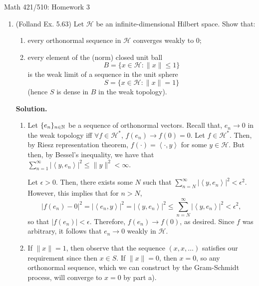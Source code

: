 \documentclass[11pt]{article}
\begin{document}
\begin{center}
{\Large Math 421/510: Homework 3}
\end{center}

\begin{enumerate}[label=\arabic*.]

\item (Folland Ex. 5.63) Let $\mathcal{H}$ be an infinite-dimensional Hilbert space. Show that:
\begin{enumerate}[label=(\alph*)]
\item every orthonormal sequence in $\mathcal{H}$ converges weakly to $0$;
\item every element of the (norm) closed unit ball
\[
B = \{x \in \mathcal{H} : \|x\| \le 1\}
\]
is the weak limit of a sequence in the unit sphere
\[
S = \{x \in \mathcal{H} : \|x\| = 1\}
\]
(hence $S$ is dense in $B$ in the weak topology).
\end{enumerate}

\vspace{1em}

\textbf{Solution.}

\begin{enumerate}
    \item Let $\{e_n\}_{n \in \mathbb{N}} $ be a sequence of orthonormal vectors.
        Recall that, $e_n \to 0$ in the weak topology iff $\forall  f \in \mathcal{H}^{*}$, $f(e_n) \to f(0) = 0$.
        Let $f \in \mathcal{H}^{*}$.
        Then, by Riesz representation theorem, $f(\cdot ) = \left<\cdot , y \right>$ for some $y \in \mathcal{H}$.
        But then, by Bessel's inequality, we have that $\sum_{n=1}^{\infty} |\left<y, e_n \right>|^2 \leq \|y\|^2 < \infty$.

        Let $\epsilon > 0$.
        Then, there exists some $N$ such that $\sum_{n = N}^{\infty} | \left<y, e_n\right>|^2 <\epsilon^2$.
        However, this implies that for $n > N$,
        \[
        |f(e_n) - 0|^2 = |\left<e_n, y \right>|^2 = |\left<y, e_n \right>|^2 \leq \sum_{n=N}^{\infty} |\left<y, e_n \right>|^2 < \epsilon^2
        ,\] 
        so that $|f(e_n)| < \epsilon$.
        Therefore, $f(e_n) \to f(0)$, as desired.
        Since $f$ was arbitrary, it follows that $e_n \to 0$ weakly in $\mathcal{H}$.
    \item If $\|x\| = 1$, then observe that the sequence $(x, x, \ldots)$ satisfies our requirement since then $x \in S$.
        If $\|x\| = 0$, then $x = 0$, so any orthonormal sequence, which we can construct by the Gram-Schmidt process, will converge to $x=0$ by part a).


\end{enumerate}
\end{enumerate}
\end{document}
